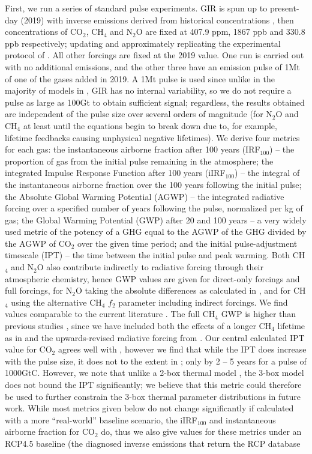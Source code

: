 \documentclass[gmd, manuscript]{copernicus}
\begin{document}
First, we run a series of standard pulse experiments. GIR is spun up to present-day (2019) with inverse emissions derived from historical concentrations \citep{Meinshausen2017}, then concentrations of CO$_2$, CH$_4$ and N$_2$O are fixed at 407.9 ppm, 1867 ppb and 330.8 ppb respectively; updating and approximately replicating the experimental protocol of \cite{Joos2013}. All other forcings are fixed at the 2019 value. One run is carried out with no additional emissions, and the other three have an emission pulse of 1Mt of one of the gases added in 2019. A 1Mt pulse is used since unlike in the majority of models in \cite{Joos2013}, GIR has no internal variability, so we do not require a pulse as large as 100Gt to obtain sufficient signal; regardless, the results obtained are independent of the pulse size over several orders of magnitude (for N$_2$O and CH$_4$ at least until the equations begin to break down due to, for example, lifetime feedbacks causing unphysical negative lifetimes). We derive four metrics for each gas: the instantaneous airborne fraction after 100 years (IRF$_{100}$) -- the proportion of gas from the initial pulse remaining in the atmosphere; the integrated Impulse Response Function after 100 years (iIRF$_{100}$) -- the integral of the instantaneous airborne fraction over the 100 years following the initial pulse; the Absolute Global Warming Potential (AGWP) -- the integrated radiative forcing over a specified number of years following the pulse, normalized per kg of gas; the Global Warming Potential (GWP) after 20 and 100 years -- a very widely used metric of the potency of a GHG equal to the AGWP of the GHG divided by the AGWP of CO$_2$ over the given time period; and the initial pulse-adjustment timescale (IPT) -- the time between the initial pulse and peak warming. Both CH$_4$ and N$_2$O also contribute indirectly to radiative forcing through their atmospheric chemistry, hence GWP values are given for direct-only forcings and full forcings, for N$_2$O taking the absolute differences as calculated in \cite{Myhre2013a}, and for CH$_4$ using the alternative CH$_4$ $f_2$ parameter including indirect forcings. We find values comparable to the current literature \citep{Joos2013,Ricke2014}. The full CH$_4$ GWP is higher than previous studies \citep{Myhre2013a,Holmes2013,Etminan2016}, since we have included both the effects of a longer CH$_4$ lifetime as in \cite{Holmes2013} and the upwards-revised radiative forcing from \cite{Etminan2016}. Our central calculated IPT value for CO$_2$ agrees well with \cite{Zickfeld2015,Ricke2014}, however we find that while the IPT does increase with the pulse size, it does not to the extent in \citeauthor{Zickfeld2015}; only by 2 -- 5 years for a pulse of 1000GtC. However, we note that unlike a 2-box thermal model \cite{Ricke2014}, the 3-box model does not bound the IPT significantly; we believe that this metric could therefore be used to further constrain the 3-box thermal parameter distributions in future work. While most metrics given below do not change significantly if calculated with a more ``real-world'' baseline scenario, the iIRF$_{100}$ and instantaneous airborne fraction for CO$_2$ do, thus we also give values for these metrics under an RCP4.5 baseline (the diagnosed inverse emissions that return the RCP database 
\end{document}
